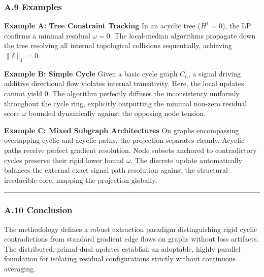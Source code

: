 \documentclass[
]{article}
\begin{document}
\subsubsection{A.9 Examples}\label{a.9-examples}

\textbf{Example A: Tree Constraint Tracking} In an acyclic tree
(\(H^1=0\)), the LP confirms a minimal residual \(\omega = 0\). The
local-median algorithms propagate down the tree resolving all internal
topological collisions sequentially, achieving \(\|\delta\|_1 = 0\).

\textbf{Example B: Simple Cycle} Given a basic cycle graph \(C_n\), a
signal driving additive directional flow violates internal transitivity.
Here, the local updates cannot yield \(0\). The algorithm perfectly
diffuses the inconsistency uniformly throughout the cycle ring,
explicitly outputting the minimal non-zero residual score \(\omega\)
bounded dynamically against the opposing node tension.

\textbf{Example C: Mixed Subgraph Architectures} On graphs encompassing
overlapping cyclic and acyclic paths, the projection separates cleanly.
Acyclic paths receive perfect gradient resolution. Node subsets anchored
to contradictory cycles preserve their rigid lower bound \(\omega\). The
discrete update automatically balances the external exact signal path
resolution against the structural irreducible core, mapping the
projection globally.

\begin{center}\rule{0.5\linewidth}{0.5pt}\end{center}

\subsubsection{A.10 Conclusion}\label{a.10-conclusion}

The methodology defines a robust extraction paradigm distinguishing
rigid cyclic contradictions from standard gradient edge flows on graphs
without loss artifacts. The distributed, primal-dual updates establish
an adoptable, highly parallel foundation for isolating residual
configurations strictly without continuous averaging.
\end{document}
